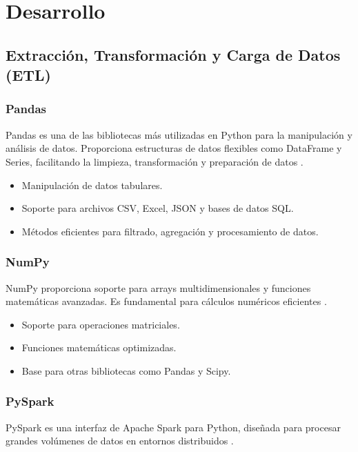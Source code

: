 \section{Desarrollo}

\subsection{Extracción, Transformación y Carga de Datos (ETL)}

\subsubsection{Pandas}
Pandas es una de las bibliotecas más utilizadas en Python para la manipulación y análisis de datos. Proporciona estructuras de datos flexibles como DataFrame y Series, facilitando la limpieza, transformación y preparación de datos \cite{mckinney2010pandas}.

\begin{itemize}
	\item Manipulación de datos tabulares.
	\item Soporte para archivos CSV, Excel, JSON y bases de datos SQL.
	\item Métodos eficientes para filtrado, agregación y procesamiento de datos.
\end{itemize}

\subsubsection{NumPy}
NumPy proporciona soporte para arrays multidimensionales y funciones matemáticas avanzadas. Es fundamental para cálculos numéricos eficientes \cite{harris2020array}.

\begin{itemize}
	\item Soporte para operaciones matriciales.
	\item Funciones matemáticas optimizadas.
	\item Base para otras bibliotecas como Pandas y Scipy.
\end{itemize}

\subsubsection{PySpark}
PySpark es una interfaz de Apache Spark para Python, diseñada para procesar grandes volúmenes de datos en entornos distribuidos \cite{zaharia2016apachespark}.

